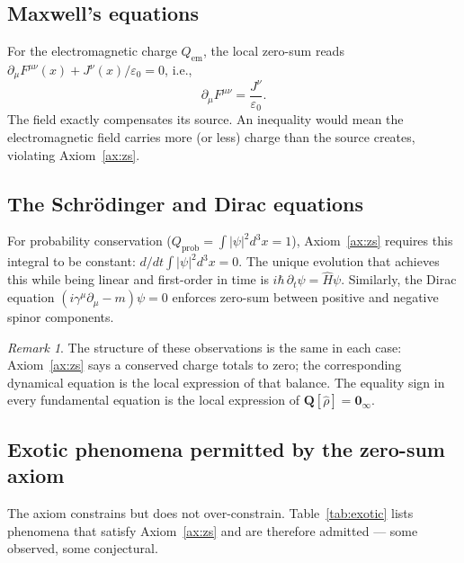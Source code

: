 \documentclass[12pt,a4paper]{article}
\theoremstyle{definition}
\theoremstyle{remark}
\newtheorem{remark}[theorem]{Remark}
\newcommand{\ZeroMat}{\mathbf{0}_{\infty}}
\newcommand{\rhohat}{\hat{\rho}}
\newcommand{\Hhat}{\hat{H}}
\begin{document}
\subsection{Maxwell's equations}

For the electromagnetic charge $Q_\mathrm{em}$, the local zero-sum reads
$\partial_\mu F^{\mu\nu}(x) + J^\nu(x)/\varepsilon_0 = 0$,
i.e.,
\begin{equation}
  \partial_\mu F^{\mu\nu} = \frac{J^\nu}{\varepsilon_0}.
\end{equation}
The field exactly compensates its source. An inequality would mean the
electromagnetic field carries more (or less) charge than the source creates,
violating Axiom~\ref{ax:zs}.

\subsection{The Schr\"odinger and Dirac equations}

For probability conservation ($Q_\mathrm{prob} = \int |\psi|^2 d^3x = 1$),
Axiom~\ref{ax:zs} requires this integral to be constant: $d/dt \int |\psi|^2
d^3x = 0$. The unique evolution that achieves this while being linear and
first-order in time is $i\hbar\,\partial_t\psi = \Hhat\psi$. Similarly, the
Dirac equation $(i\gamma^\mu\partial_\mu - m)\psi = 0$ enforces zero-sum
between positive and negative spinor components.

\begin{remark}
The structure of these observations is the same in each case: Axiom~\ref{ax:zs}
says a conserved charge totals to zero; the corresponding dynamical equation
is the local expression of that balance. The equality sign in every fundamental
equation is the local expression of $\mathbf{Q}[\rhohat] = \ZeroMat$.
\end{remark}

\subsection{Exotic phenomena permitted by the zero-sum axiom}

The axiom constrains but does not over-constrain. Table~\ref{tab:exotic}
lists phenomena that satisfy Axiom~\ref{ax:zs} and are therefore admitted
--- some observed, some conjectural.
\end{document}
